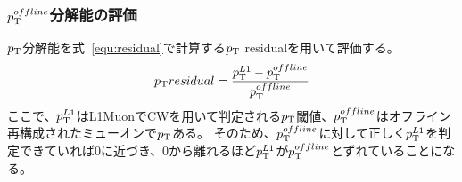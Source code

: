 \subsubsection{$p_{\rm{T}}^{offline}$分解能の評価}\label{分解能の評価}
$p_{\rm{T}}$分解能を式~\eqref{equ:residual}で計算する$p_{\rm{T}}$ residualを用いて評価する。
\begin{equation}
    p_{\rm{T}} residual = \frac{p_{\rm{T}}^{L1}-p_{\rm{T}}^{offline}}{p_{\rm{T}}^{offline}}
    \label{equ:residual}
\end{equation}
ここで、$p_{\rm{T}}^{L1}$はL1MuonでCWを用いて判定される$p_{\rm{T}}$閾値、$p_{\rm{T}}^{offline}$はオフライン再構成されたミューオンで$p_{\rm{T}}$ある。
そのため、$p_{\rm{T}}^{offline}$に対して正しく$p_{\rm{T}}^{L1}$を判定できていれば0に近づき、0から離れるほど$p_{\rm{T}}^{L1}$が$p_{\rm{T}}^{offline}$とずれていることになる。

